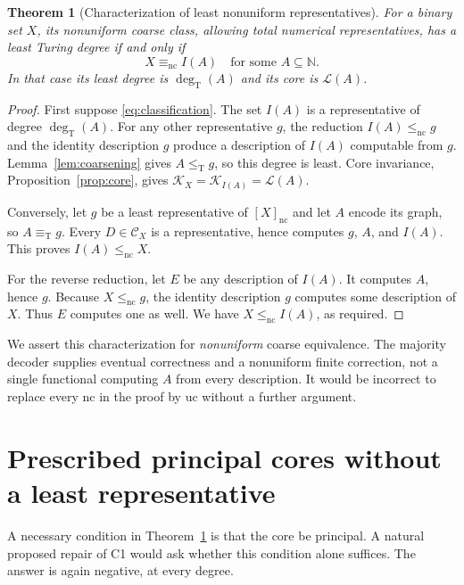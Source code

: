 \documentclass[11pt,a4paper]{article}
\newcommand{\N}{\mathbb N}
\newcommand{\leT}{\leq_{\mathrm T}}
\newcommand{\eqT}{\equiv_{\mathrm T}}
\newcommand{\nc}{\mathrm{nc}}
\newcommand{\uc}{\mathrm{uc}}
\newcommand{\CD}[1]{\mathcal C_{#1}}
\newcommand{\Core}[1]{\mathcal K_{#1}}
\newcommand{\Low}[1]{\mathcal L(#1)}
\newcommand{\degT}{\operatorname{deg}_{\mathrm T}}
\newtheorem{theorem}{Theorem}[section]
\theoremstyle{definition}\newtheorem{definition}[theorem]{Definition}
\theoremstyle{remark}\newtheorem{remark}[theorem]{Remark}
\begin{document}
\begin{theorem}[Characterization of least nonuniform representatives]\label{thm:classification}
For a binary set $X$, its nonuniform coarse class, allowing total numerical representatives, has a least Turing degree if and only if
\begin{equation}\label{eq:classification}
                     X\equiv_{\nc}I(A)
                     \quad\text{for some }A\subseteq\N.
\end{equation}
In that case its least degree is $\degT(A)$ and its core is $\Low A$.
\end{theorem}
\begin{proof}
First suppose \eqref{eq:classification}. The set $I(A)$ is a representative of degree $\degT(A)$. For any other representative $g$, the reduction $I(A)\le_{\nc}g$ and the identity description $g$ produce a description of $I(A)$ computable from $g$. Lemma~\ref{lem:coarsening} gives $A\leT g$, so this degree is least. Core invariance, Proposition~\ref{prop:core}, gives $\Core X=\Core{I(A)}=\Low A$.

Conversely, let $g$ be a least representative of $[X]_{\nc}$ and let $A$ encode its graph, so $A\eqT g$. Every $D\in\CD X$ is a representative, hence computes $g$, $A$, and $I(A)$. This proves $I(A)\le_{\nc}X$.

For the reverse reduction, let $E$ be any description of $I(A)$. It computes $A$, hence $g$. Because $X\le_{\nc}g$, the identity description $g$ computes some description of $X$. Thus $E$ computes one as well. We have $X\le_{\nc}I(A)$, as required.
\end{proof}

We assert this characterization for \emph{nonuniform} coarse equivalence. The majority decoder supplies eventual correctness and a nonuniform finite correction, not a single functional computing $A$ from every description. It would be incorrect to replace every $\nc$ in the proof by $\uc$ without a further argument.

\section{Prescribed principal cores without a least representative}
\label{sec:prescribed}
A necessary condition in Theorem~\ref{thm:classification} is that the core be principal. A natural proposed repair of C1 would ask whether this condition alone suffices. The answer is again negative, at every degree.
\end{document}
